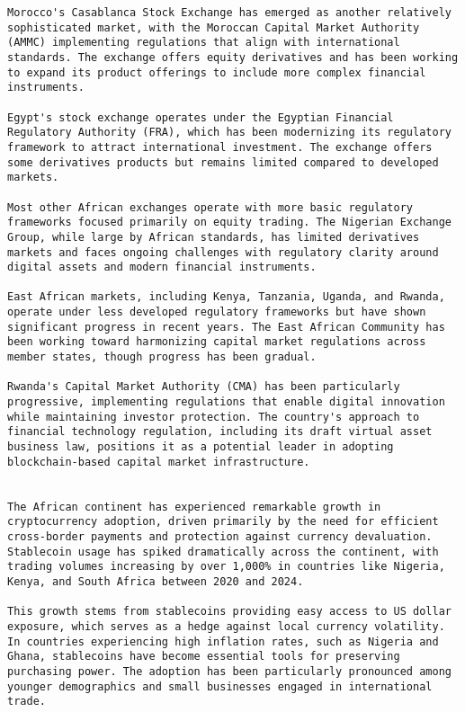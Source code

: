 \documentclass[12pt]{article}
\begin{document}
{{{\begin{itemize}
\begin{lstlisting}
Morocco's Casablanca Stock Exchange has emerged as another relatively sophisticated market, with the Moroccan Capital Market Authority (AMMC) implementing regulations that align with international standards. The exchange offers equity derivatives and has been working to expand its product offerings to include more complex financial instruments.

Egypt's stock exchange operates under the Egyptian Financial Regulatory Authority (FRA), which has been modernizing its regulatory framework to attract international investment. The exchange offers some derivatives products but remains limited compared to developed markets.

Most other African exchanges operate with more basic regulatory frameworks focused primarily on equity trading. The Nigerian Exchange Group, while large by African standards, has limited derivatives markets and faces ongoing challenges with regulatory clarity around digital assets and modern financial instruments.

East African markets, including Kenya, Tanzania, Uganda, and Rwanda, operate under less developed regulatory frameworks but have shown significant progress in recent years. The East African Community has been working toward harmonizing capital market regulations across member states, though progress has been gradual.

Rwanda's Capital Market Authority (CMA) has been particularly progressive, implementing regulations that enable digital innovation while maintaining investor protection. The country's approach to financial technology regulation, including its draft virtual asset business law, positions it as a potential leader in adopting blockchain-based capital market infrastructure.


The African continent has experienced remarkable growth in cryptocurrency adoption, driven primarily by the need for efficient cross-border payments and protection against currency devaluation. Stablecoin usage has spiked dramatically across the continent, with trading volumes increasing by over 1,000% in countries like Nigeria, Kenya, and South Africa between 2020 and 2024.

This growth stems from stablecoins providing easy access to US dollar exposure, which serves as a hedge against local currency volatility. In countries experiencing high inflation rates, such as Nigeria and Ghana, stablecoins have become essential tools for preserving purchasing power. The adoption has been particularly pronounced among younger demographics and small businesses engaged in international trade.


\end{lstlisting}
\end{itemize}}}}
\end{document}
